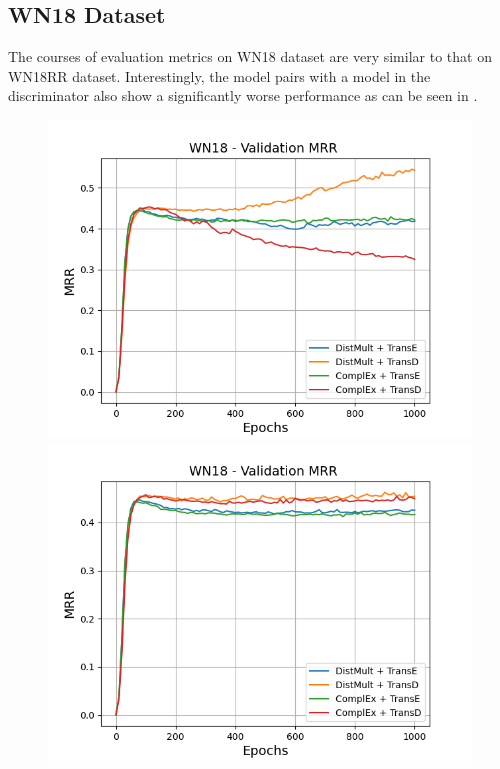 \subsection{WN18 Dataset}
\label{subsec:methods_wn18}


The courses of evaluation metrics on \textsc{WN18} dataset are very similar to that on \textsc{WN18RR} dataset.
Interestingly, the model pairs with a \transd model in the discriminator also show a significantly worse performance as can be seen in .
\begin{figure}
    \centering
    \begin{minipage}{.5\textwidth}
      \centering
      \includegraphics[width=0.9\linewidth]{figures/results/gan_train/not_pretrained/uncertainty/max/entropy/wn18/1k_epochs/uncertainty_wn18_mrrs.png}
    \end{minipage}%
    \begin{minipage}{.5\textwidth}
      \centering
      \includegraphics[width=0.9\linewidth]{figures/results/gan_train/not_pretrained/uncertainty/max_distribution/entropy/wn18/1k_epochs/uncertainty_wn18_mrrs.png}

\end{minipage}
\end{figure}
